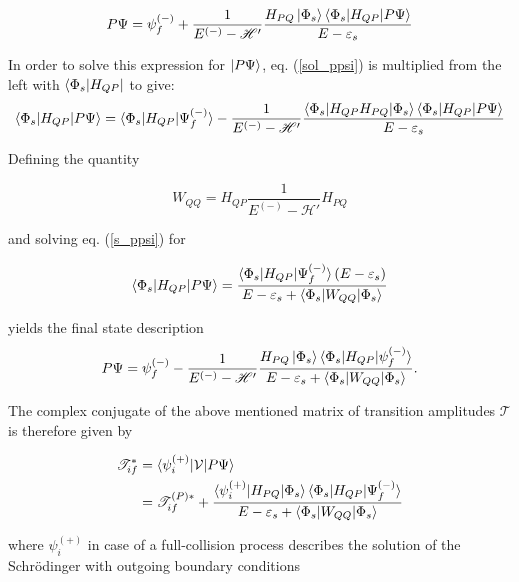 \begin{equation}\label{sol_ppsi}
  P \Psi = \psi_f^{(-)} + \frac{1}{E^{(-)} - \mathscr{H}'}
           \frac{H_{PQ}\ket{\Phi_s}
           \braket{\Phi_s|H_{QP}|P\Psi}}{E - \varepsilon_s} 
\end{equation}

In order to solve this expression for $\ket{P \Psi}$,
eq. (\ref{sol_ppsi})
is multiplied from the left with $\bra{\Phi_s|H_{QP}}$ to give:
\begin{equation}
  \braket{\Phi_s|H_{QP}|P\Psi} = \braket{\Phi_s|H_{QP}|\Psi_f^{(-)}} -
  \frac{1}{E^{(-)} - \mathscr{H}'}
  \frac{\braket{\Phi_s|H_{QP}H_{PQ}|\Phi_s} \braket{\Phi_s|H_{QP}|P\Psi}}
       {E - \varepsilon_s}  \label{s_ppsi} 
\end {equation}

Defining the quantity

\begin{equation}
  W_{QQ} = H_{QP}\frac{1}{E^{(-)} - \mathscr{H}'}H_{PQ}
\end{equation}

and solving eq. (\ref{s_ppsi}) for

\begin{equation}
  \braket{\Phi_s|H_{QP}|P\Psi} = \frac{\braket{\Phi_s|H_{QP}|\Psi_f^{(-)}}(E-\varepsilon_s)}
{E - \varepsilon_s + \braket{\Phi_s|W_{QQ}|\Phi_s}}
\end{equation}

yields the final state description
\begin{equation}\label{}
  P \Psi = \psi_f^{(-)} - \frac{1}{E^{(-)} - \mathscr{H}'}
           \frac{H_{PQ}\ket{\Phi_s}
           \braket{\Phi_s|H_{QP}|\psi_f^{(-)}}}
           {E - \varepsilon_s + \braket{\Phi_s|W_{QQ}|\Phi_s}} .
\end{equation}



The complex conjugate of the above mentioned matrix of transition
amplitudes $\mathcal{T}$
is therefore given by


\begin{align}
  \mathscr{T}_{if}^* &= \braket{\psi_i^{(+)}| \mathcal{V} | P\Psi} \\
                   &= \mathscr{T}_{if}^{(P)*} + 
                     \frac{\braket{\psi_i^{(+)}|H_{PQ}|\Phi_s}
                           \braket{\Phi_s|H_{QP}|\Psi_f^{(-)}}}
                          {E-\varepsilon_s + \braket{\Phi_s|W_{QQ}|\Phi_s}}
\end{align}

where $\psi_i^{(+)}$ in case of a full-collision process describes
the solution of the Schrödinger with outgoing
boundary conditions

